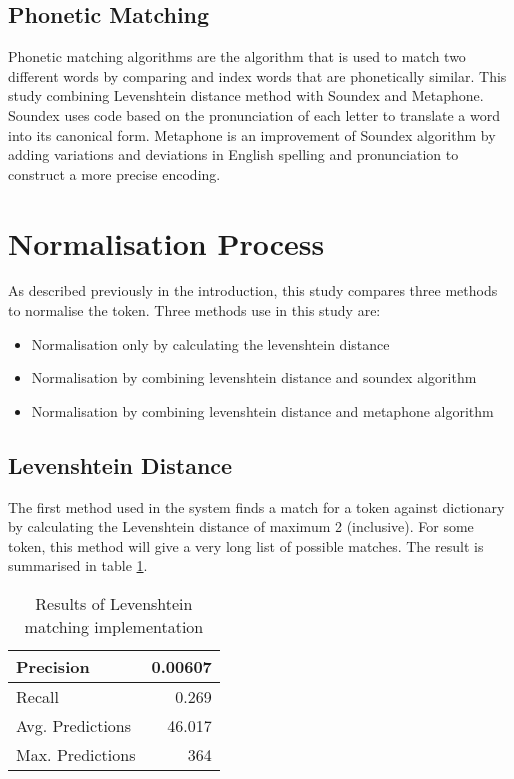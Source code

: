 \documentclass[11pt]{article}
\begin{document}
\subsection{Phonetic Matching}
Phonetic matching algorithms are the algorithm that is used to match two different words by comparing and index words that are phonetically similar. This study combining Levenshtein distance method with Soundex\footnotemark[\value{footnote}] \cite{PhoneticStringMatching,JellyFish} and Metaphone\footnotemark[\value{footnote}] \cite{Metaphone,JellyFish}. Soundex uses code based on the pronunciation of each letter to translate a word into its canonical form. Metaphone is an improvement of Soundex algorithm by adding variations and deviations in English spelling and pronunciation to construct a more precise encoding.


\section{Normalisation Process}
As described previously in the introduction, this study compares three methods to normalise the token. Three methods use in this study are:
\begin{itemize}
    \item Normalisation only by calculating the levenshtein distance
    \item Normalisation by combining levenshtein distance and soundex algorithm
    \item Normalisation by combining levenshtein distance and metaphone algorithm
\end{itemize}


\subsection{Levenshtein Distance}
The first method used in the system finds a match for a token against dictionary by calculating the Levenshtein distance of maximum 2 (inclusive). For some token, this method will give a very long list of possible matches. The result is summarised in table \ref{table:1}. 
\begin{table}[h!]
    \centering
    \begin{tabular}{|l||r|}
    \hline
        Precision & 0.00607 \\
    \hline
        Recall & 0.269 \\
    \hline
        Avg. Predictions & 46.017 \\
    \hline
        Max. Predictions & 364 \\
    \hline
    \end{tabular}
    \caption{Results of Levenshtein matching implementation}
    \label{table:1}
\end{table}
\end{document}
